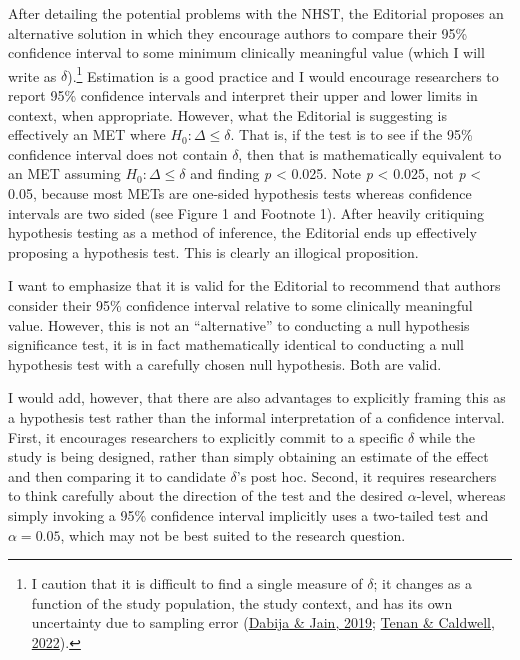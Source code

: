\documentclass[]{cik}%
\begin{document}
After detailing the potential problems with the NHST, the Editorial
proposes an alternative solution in which they encourage authors to
compare their 95\% confidence interval to some minimum clinically
meaningful value (which I will write as \(\delta\)).\footnote{I caution
  that it is difficult to find a single measure of \(\delta\); it
  changes as a function of the study population, the study context, and
  has its own uncertainty due to sampling error
  (\protect\hyperlink{ref-25}{Dabija \& Jain, 2019};
  \protect\hyperlink{ref-19}{Tenan \& Caldwell, 2022}).} Estimation is a
good practice and I would encourage researchers to report 95\%
confidence intervals and interpret their upper and lower limits in
context, when appropriate. However, what the Editorial is suggesting is
effectively an MET where \(H_{0}: \Delta \leq \delta\). That is, if the
test is to see if the 95\% confidence interval does not contain
\(\delta\), then that is mathematically equivalent to an MET assuming
\(H_{0}: \Delta \leq \delta\) and finding \emph{p} \textless{} 0.025.
Note \emph{p} \textless{} 0.025, not \emph{p} \textless{} 0.05, because
most METs are one-sided hypothesis tests whereas confidence intervals
are two sided (see Figure 1 and Footnote 1). After heavily critiquing
hypothesis testing as a method of inference, the Editorial ends up
effectively proposing a hypothesis test. This is clearly an illogical
proposition.

I want to emphasize that it is valid for the Editorial to recommend that
authors consider their 95\% confidence interval relative to some
clinically meaningful value. However, this is not an ``alternative'' to
conducting a null hypothesis significance test, it is in fact
mathematically identical to conducting a null hypothesis test with a
carefully chosen null hypothesis. Both are valid.

I would add, however, that there are also advantages to explicitly
framing this as a hypothesis test rather than the informal
interpretation of a confidence interval. First, it encourages
researchers to explicitly commit to a specific \(\delta\) while the
study is being designed, rather than simply obtaining an estimate of the
effect and then comparing it to candidate \(\delta\)'s post hoc. Second,
it requires researchers to think carefully about the direction of the
test and the desired \(\alpha\)-level, whereas simply invoking a 95\%
confidence interval implicitly uses a two-tailed test and
\(\alpha = 0.05\), which may not be best suited to the research
question.
\end{document}
